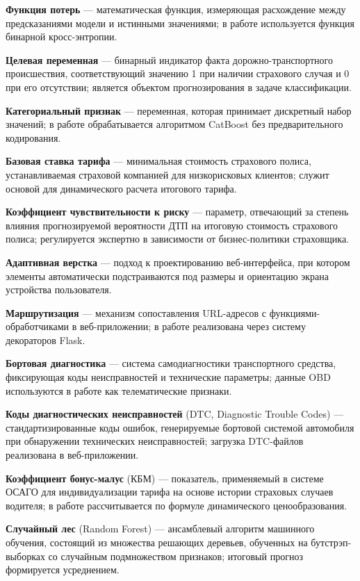 \textbf{Функция потерь} --- математическая функция, измеряющая расхождение между предсказаниями модели и истинными значениями; в работе используется функция бинарной кросс-энтропии.

\textbf{Целевая переменная} --- бинарный индикатор факта дорожно-транспортного происшествия, соответствующий значению 1 при наличии страхового случая и 0 при его отсутствии; является объектом прогнозирования в задаче классификации.

\textbf{Категориальный признак} --- переменная, которая принимает дискретный набор значений; в работе обрабатывается алгоритмом CatBoost без предварительного кодирования.

\textbf{Базовая ставка тарифа} --- минимальная стоимость страхового полиса, устанавливаемая страховой компанией для низкорисковых клиентов; служит основой для динамического расчета итогового тарифа.

\textbf{Коэффициент чувствительности к риску} --- параметр, отвечающий за степень влияния прогнозируемой вероятности ДТП на итоговую стоимость страхового полиса; регулируется экспертно в зависимости от бизнес-политики страховщика.

\textbf{Адаптивная верстка} --- подход к проектированию веб-интерфейса, при котором элементы автоматически подстраиваются под размеры и ориентацию экрана устройства пользователя.

\textbf{Маршрутизация} --- механизм сопоставления URL-адресов с функциями-обработчиками в веб-приложении; в работе реализована через систему декораторов Flask.

\textbf{Бортовая диагностика} --- система самодиагностики транспортного средства, фиксирующая коды неисправностей и технические параметры; данные OBD используются в работе как телематические признаки.

\textbf{Коды диагностических неисправностей} (DTC, Diagnostic Trouble Codes) --- стандартизированные коды ошибок, генерируемые бортовой системой автомобиля при обнаружении технических неисправностей; загрузка DTC-файлов реализована в веб-приложении.

\textbf{Коэффициент бонус-малус} (КБМ) --- показатель, применяемый в системе ОСАГО для индивидуализации тарифа на основе истории страховых случаев водителя; в работе рассчитывается по формуле динамического ценообразования.

\textbf{Случайный лес} (Random Forest) --- ансамблевый алгоритм машинного обучения, состоящий из множества решающих деревьев, обученных на бутстрэп-выборках со случайным подмножеством признаков; итоговый прогноз формируется усреднением.

